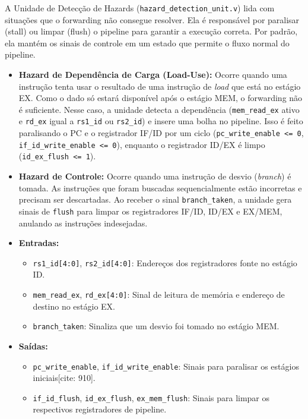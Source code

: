 \documentclass[12pt, a4paper]{article}
\begin{document}
A Unidade de Detecção de Hazards (\texttt{hazard\_detection\_unit.v}) lida com situações que o forwarding não consegue resolver. Ela é responsável por paralisar (stall) ou limpar (flush) o pipeline para garantir a execução correta. Por padrão, ela mantém os sinais de controle em um estado que permite o fluxo normal do pipeline.

\begin{itemize}
    \item \textbf{Hazard de Dependência de Carga (Load-Use):} Ocorre quando uma instrução tenta usar o resultado de uma instrução de \textit{load} que está no estágio EX. Como o dado só estará disponível após o estágio MEM, o forwarding não é suficiente. Nesse caso, a unidade detecta a dependência (\texttt{mem\_read\_ex} ativo e \texttt{rd\_ex} igual a \texttt{rs1\_id} ou \texttt{rs2\_id}) e insere uma bolha no pipeline. Isso é feito paralisando o PC e o registrador IF/ID por um ciclo (\texttt{pc\_write\_enable <= 0}, \texttt{if\_id\_write\_enable <= 0}), enquanto o registrador ID/EX é limpo (\texttt{id\_ex\_flush <= 1}).

    \item \textbf{Hazard de Controle:} Ocorre quando uma instrução de desvio (\textit{branch}) é tomada. As instruções que foram buscadas sequencialmente estão incorretas e precisam ser descartadas. Ao receber o sinal \texttt{branch\_taken}, a unidade gera sinais de \texttt{flush} para limpar os registradores IF/ID, ID/EX e EX/MEM, anulando as instruções indesejadas.
\end{itemize}

\begin{itemize}
    \item \textbf{Entradas:}
    \begin{itemize}
        \item \texttt{rs1\_id[4:0]}, \texttt{rs2\_id[4:0]}: Endereços dos registradores fonte no estágio ID.
        \item \texttt{mem\_read\_ex}, \texttt{rd\_ex[4:0]}: Sinal de leitura de memória e endereço de destino no estágio EX.
        \item \texttt{branch\_taken}: Sinaliza que um desvio foi tomado no estágio MEM.
    \end{itemize}
    \item \textbf{Saídas:}
    \begin{itemize}
        \item \texttt{pc\_write\_enable}, \texttt{if\_id\_write\_enable}: Sinais para paralisar os estágios iniciais[cite: 910].
        \item \texttt{if\_id\_flush}, \texttt{id\_ex\_flush}, \texttt{ex\_mem\_flush}: Sinais para limpar os respectivos registradores de pipeline.
    \end{itemize}
\end{itemize}
\end{document}

